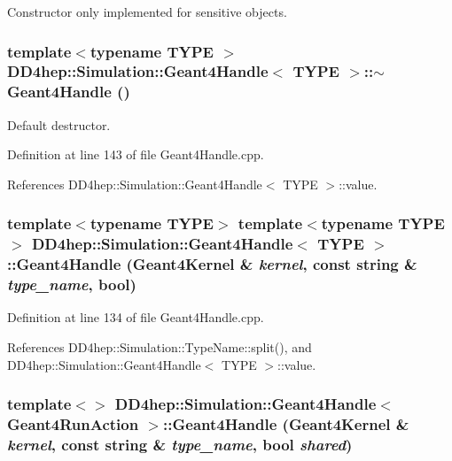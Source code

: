 Constructor only implemented for sensitive objects. \hypertarget{class_d_d4hep_1_1_simulation_1_1_geant4_handle_adfcf2edb6e30d0780f2a20a8be6f47b5}{
\subsubsection[{$\sim$Geant4Handle}]{\setlength{\rightskip}{0pt plus 5cm}template$<$typename TYPE $>$ {\bf DD4hep::Simulation::Geant4Handle}$<$ TYPE $>$::$\sim${\bf Geant4Handle} ()}}
\label{class_d_d4hep_1_1_simulation_1_1_geant4_handle_adfcf2edb6e30d0780f2a20a8be6f47b5}


Default destructor. 

Definition at line 143 of file Geant4Handle.cpp.

References DD4hep::Simulation::Geant4Handle$<$ TYPE $>$::value.\hypertarget{class_d_d4hep_1_1_simulation_1_1_geant4_handle_acb0ba7283673cbb6a5afcf44703ce206}{
\subsubsection[{Geant4Handle}]{\setlength{\rightskip}{0pt plus 5cm}template$<$typename TYPE$>$ template$<$typename TYPE $>$ {\bf DD4hep::Simulation::Geant4Handle}$<$ TYPE $>$::{\bf Geant4Handle} ({\bf Geant4Kernel} \& {\em kernel}, \/  const {\bf string} \& {\em type\_\-name}, \/  bool)}}
\label{class_d_d4hep_1_1_simulation_1_1_geant4_handle_acb0ba7283673cbb6a5afcf44703ce206}


Definition at line 134 of file Geant4Handle.cpp.

References DD4hep::Simulation::TypeName::split(), and DD4hep::Simulation::Geant4Handle$<$ TYPE $>$::value.\hypertarget{class_d_d4hep_1_1_simulation_1_1_geant4_handle_ad5bdbeb7b854db18b4da3888f46dcd0f}{
\subsubsection[{Geant4Handle}]{\setlength{\rightskip}{0pt plus 5cm}template$<$$>$ {\bf DD4hep::Simulation::Geant4Handle}$<$ {\bf Geant4RunAction} $>$::{\bf Geant4Handle} ({\bf Geant4Kernel} \& {\em kernel}, \/  const {\bf string} \& {\em type\_\-name}, \/  bool {\em shared})}}
\label{class_d_d4hep_1_1_simulation_1_1_geant4_handle_ad5bdbeb7b854db18b4da3888f46dcd0f}


